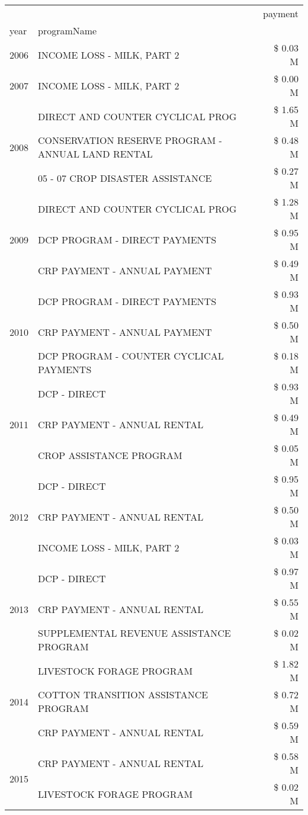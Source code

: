 \begin{tabular}{llr}
\toprule
 &  & payment \\
year & programName &  \\
\midrule
2006 & INCOME LOSS - MILK, PART 2 & \$ 0.03 M \\
\cline{1-3}
2007 & INCOME LOSS - MILK, PART 2 & \$ 0.00 M \\
\cline{1-3}
\multirow[t]{3}{*}{2008} & DIRECT AND COUNTER CYCLICAL PROG & \$ 1.65 M \\
 & CONSERVATION RESERVE PROGRAM - ANNUAL LAND RENTAL & \$ 0.48 M \\
 & 05 - 07 CROP DISASTER ASSISTANCE & \$ 0.27 M \\
\cline{1-3}
\multirow[t]{3}{*}{2009} & DIRECT AND COUNTER CYCLICAL PROG & \$ 1.28 M \\
 & DCP PROGRAM - DIRECT PAYMENTS & \$ 0.95 M \\
 & CRP PAYMENT - ANNUAL PAYMENT & \$ 0.49 M \\
\cline{1-3}
\multirow[t]{3}{*}{2010} & DCP PROGRAM - DIRECT PAYMENTS & \$ 0.93 M \\
 & CRP PAYMENT - ANNUAL PAYMENT & \$ 0.50 M \\
 & DCP PROGRAM - COUNTER CYCLICAL PAYMENTS & \$ 0.18 M \\
\cline{1-3}
\multirow[t]{3}{*}{2011} & DCP - DIRECT & \$ 0.93 M \\
 & CRP PAYMENT - ANNUAL RENTAL & \$ 0.49 M \\
 & CROP ASSISTANCE PROGRAM & \$ 0.05 M \\
\cline{1-3}
\multirow[t]{3}{*}{2012} & DCP - DIRECT & \$ 0.95 M \\
 & CRP PAYMENT - ANNUAL RENTAL & \$ 0.50 M \\
 & INCOME LOSS - MILK, PART 2 & \$ 0.03 M \\
\cline{1-3}
\multirow[t]{3}{*}{2013} & DCP - DIRECT & \$ 0.97 M \\
 & CRP PAYMENT - ANNUAL RENTAL & \$ 0.55 M \\
 & SUPPLEMENTAL REVENUE ASSISTANCE PROGRAM & \$ 0.02 M \\
\cline{1-3}
\multirow[t]{3}{*}{2014} & LIVESTOCK FORAGE PROGRAM & \$ 1.82 M \\
 & COTTON TRANSITION ASSISTANCE PROGRAM & \$ 0.72 M \\
 & CRP PAYMENT - ANNUAL RENTAL & \$ 0.59 M \\
\cline{1-3}
\multirow[t]{3}{*}{2015} & CRP PAYMENT - ANNUAL RENTAL & \$ 0.58 M \\
 & LIVESTOCK FORAGE PROGRAM & \$ 0.02 M \\

\end{tabular}
